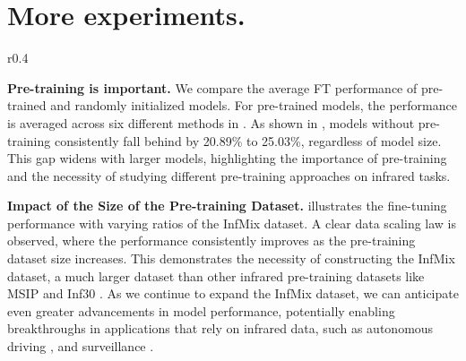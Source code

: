 \section{More experiments.}
\label{app:more_experiments}

% 

% 
% 


\begin{wraptable}{r}{0.4\textwidth}
    \centering
    \vspace{-7.5mm}
    \caption{Comparison of initialization.}
    \label{tab:wo_pretrain}
    \centering
    \scriptsize
    \vspace{-3.5mm}
\end{wraptable}

\textbf{Pre-training is important.} We compare the average FT performance of pre-trained and randomly initialized models. For pre-trained models, the performance is averaged across six different methods in . As shown in , models without pre-training consistently fall behind by 20.89\% to 25.03\%, regardless of model size. This gap widens with larger models, highlighting the importance of pre-training and the necessity of studying different pre-training approaches on infrared tasks.

\textbf{Impact of the Size of the Pre-training Dataset.}  illustrates the fine-tuning performance with varying ratios of the InfMix dataset. A clear data scaling law is observed, where the performance consistently improves as the pre-training dataset size increases. This demonstrates the necessity of constructing the InfMix dataset, a much larger dataset than other infrared pre-training datasets like MSIP \citep{pad} and Inf30 \citep{infmae}. As we continue to expand the InfMix dataset, we can anticipate even greater advancements in model performance, potentially enabling breakthroughs in applications that rely on infrared data, such as autonomous driving \citep{mcnet}, and surveillance \citep{birdsai}.

